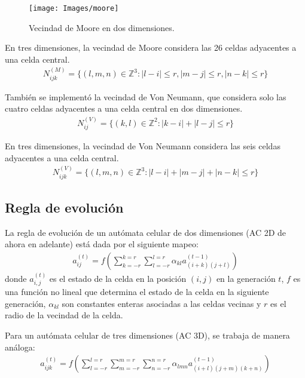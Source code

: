 \begin{figure}[H]
    \centering
    \texttt{[image: Images/moore]}
    \caption{Vecindad de Moore en dos dimensiones.}
    \label{fig:moore}
\end{figure}

En tres dimensiones, la vecindad de Moore considera las 26 celdas adyacentes a una celda central.
\begin{equation}
    \label{eq:moore_neighborhood_3d}
    \begin{aligned}
        N^{(M)}_{ijk} = \{(l,m,n) \in \mathbb{Z}^3 : |l-i| \leq r, |m-j| \leq r, |n-k| \leq r\}
    \end{aligned}
\end{equation}

También se implementó la vecindad de Von Neumann, que considera solo las cuatro celdas adyacentes a una celda central en dos dimensiones.
\begin{equation}
    \label{eq:von_neumann_neighborhood}
    \begin{aligned}
        N^{(V)}_{ij} = \{(k,l) \in \mathbb{Z}^2 : |k-i| + |l-j| \leq r\}
    \end{aligned}
\end{equation}

En tres dimensiones, la vecindad de Von Neumann considera las seis celdas adyacentes a una celda central.
\begin{equation}
    \label{eq:von_neumann_neighborhood_3d}
    \begin{aligned}
        N^{(V)}_{ijk} = \{(l,m,n) \in \mathbb{Z}^3 : |l-i| + |m-j| + |n-k| \leq r\}
    \end{aligned}
\end{equation}


\subsection{Regla de evolución}
\label{subsec:evolucion}
La regla de evolución de un autómata celular de dos dimensiones (AC 2D de ahora en adelante) está dada por el siguiente mapeo:
\begin{equation}
    \label{eq:evolution_rule}
    \begin{aligned}
        a_{ij}^{(t)} = f(\sum^{k=r}_{k=-r}\sum^{l=r}_{l=-r}{\alpha_{kl}a_{(i+k)(j+l)}^{(t-1)}})
    \end{aligned}
\end{equation}
donde $a_{i,j}^{(t)}$ es el estado de la celda en la posición $(i,j)$ en la generación $t$, $f$ es una función no lineal que determina el estado de la celda en la siguiente generación, $\alpha_{kl}$ son constantes enteras asociadas a las celdas vecinas y $r$ es el radio de la vecindad de la celda.

Para un autómata celular de tres dimensiones (AC 3D), se trabaja de manera análoga:
\begin{equation}
    \label{eq:evolution_rule_3d}
    \begin{aligned}
        a_{ijk}^{(t)} = f(\sum^{l=r}_{l=-r}\sum^{m=r}_{m=-r}\sum^{n=r}_{n=-r}{\alpha_{lmn}a_{(i+l)(j+m)(k+n)}^{(t-1)}})
    \end{aligned}
\end{equation}